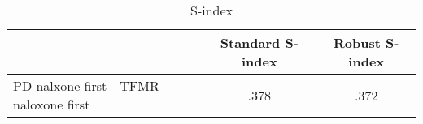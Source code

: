 \begin{table}[htbp] \centering
\def\sym#1{\ifmmode^{#1}\else\(^{#1}\)\fi}
  \caption{S-index} %
  \begin{adjustbox}{max width=\linewidth}\begin{tabular}{l*{2}{c}}
    \toprule
     & Standard S-index & Robust S-index \\ 
    \midrule
    PD nalxone first - TFMR naloxone first & .378 & .372\\ 
    \bottomrule
  \end{tabular} \end{adjustbox}
\end{table}